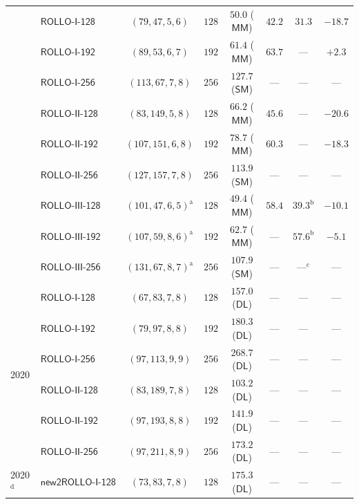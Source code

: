 \documentclass[11pt,a4paper]{article}
\theoremstyle{definition}
\theoremstyle{remark}
\begin{document}
\begin{table}[p]
\begin{tabular}{@{}llcccccc@{}}
 & $\mathsf{ROLLO\text{-}I\text{-}128}$ & $(79, 47, 5, 6)$ & $128$ & $50.0$ ($\mathsf{MM}$) & $42.2$ & $31.3$ & $-18.7$ \\
 & $\mathsf{ROLLO\text{-}I\text{-}192}$ & $(89, 53, 6, 7)$ & $192$ & $61.4$ ($\mathsf{MM}$) & $63.7$ & --- & $+2.3$ \\
 & $\mathsf{ROLLO\text{-}I\text{-}256}$ & $(113, 67, 7, 8)$ & $256$ & $127.7$ ($\mathsf{SM}$) & --- & --- & --- \\
 & $\mathsf{ROLLO\text{-}II\text{-}128}$ & $(83, 149, 5, 8)$ & $128$ & $66.2$ ($\mathsf{MM}$) & $45.6$ & --- & $-20.6$ \\
 & $\mathsf{ROLLO\text{-}II\text{-}192}$ & $(107, 151, 6, 8)$ & $192$ & $78.7$ ($\mathsf{MM}$) & $60.3$ & --- & $-18.3$ \\
 & $\mathsf{ROLLO\text{-}II\text{-}256}$ & $(127, 157, 7, 8)$ & $256$ & $113.9$ ($\mathsf{SM}$) & --- & --- & --- \\
 & $\mathsf{ROLLO\text{-}III\text{-}128}$ & $(101, 47, 6, 5)^{\mathrm{a}}$ & $128$ & $49.4$ ($\mathsf{MM}$) & $58.4$ & $39.3^{\mathrm{b}}$ & $-10.1$ \\
 & $\mathsf{ROLLO\text{-}III\text{-}192}$ & $(107, 59, 8, 6)^{\mathrm{a}}$ & $192$ & $62.7$ ($\mathsf{MM}$) & --- & $57.6^{\mathrm{b}}$ & $-5.1$ \\
 & $\mathsf{ROLLO\text{-}III\text{-}256}$ & $(131, 67, 8, 7)^{\mathrm{a}}$ & $256$ & $107.9$ ($\mathsf{SM}$) & --- & ---$^{\mathrm{c}}$ & --- \\
\midrule
\multirow{6}{*}{2020}
 & $\mathsf{ROLLO\text{-}I\text{-}128}$ & $(67, 83, 7, 8)$ & $128$ & $157.0$ ($\mathsf{DL}$) & --- & --- & --- \\
 & $\mathsf{ROLLO\text{-}I\text{-}192}$ & $(79, 97, 8, 8)$ & $192$ & $180.3$ ($\mathsf{DL}$) & --- & --- & --- \\
 & $\mathsf{ROLLO\text{-}I\text{-}256}$ & $(97, 113, 9, 9)$ & $256$ & $268.7$ ($\mathsf{DL}$) & --- & --- & --- \\
 & $\mathsf{ROLLO\text{-}II\text{-}128}$ & $(83, 189, 7, 8)$ & $128$ & $103.2$ ($\mathsf{DL}$) & --- & --- & --- \\
 & $\mathsf{ROLLO\text{-}II\text{-}192}$ & $(97, 193, 8, 8)$ & $192$ & $141.9$ ($\mathsf{DL}$) & --- & --- & --- \\
 & $\mathsf{ROLLO\text{-}II\text{-}256}$ & $(97, 211, 8, 9)$ & $256$ & $173.2$ ($\mathsf{DL}$) & --- & --- & --- \\
\midrule
\multirow{3}{*}{2020$^{\mathrm{d}}$}
 & $\mathsf{new2ROLLO\text{-}I\text{-}128}$ & $(73, 83, 7, 8)$ & $128$ & $175.3$ ($\mathsf{DL}$) & --- & --- & --- \\

\end{tabular}
\end{table}
\end{document}
